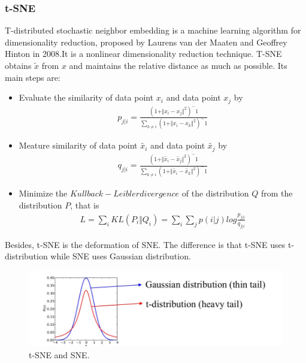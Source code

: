 \documentclass{article}
\begin{document}
\subsubsection{t-SNE}
\indent T-distributed stochastic neighbor embedding is a machine learning algorithm for dimensionality reduction, proposed by Laurens van der Maaten and Geoffrey Hinton in 2008.\cite{maaten2008visualizing}It is a nonlinear dimensionality reduction technique. T-SNE obtains $\tilde{x}$ from $x$ and maintains the relative distance as much as possible. Its main steps are:
\begin{itemize}
	\item  Evaluate the similarity of data point $x_i$ and data point $x_j$ by
	\begin{eqnarray}
	p_{j|i}=\frac{(1+\Vert x_i-x_j \Vert^2)^-1}{\sum_{k\neq i}(1+\Vert x_i-x_k \Vert^2)^-1}
	\end{eqnarray}
	
	\item  Meature similarity of data point $\tilde{x_i}$ and data point $\tilde{x_j}$ by
	\begin{eqnarray}
	q_{j|i}=\frac{(1+\Vert \tilde{x_i}-\tilde{x_j} \Vert^2)^-1}{\sum_{k\neq i}(1+\Vert \tilde{x_i}-\tilde{x_k} \Vert^2)^-1}
	\end{eqnarray}
	
	\item  Minimize the $Kullback-Leibler divergence$ of the distribution $Q$ from the distribution $P$, that is
	\begin{eqnarray}
	L = \sum_{i}KL(P_i\Vert Q_i)=\sum_{i}\sum_{j}p(i|j)log\frac{p_{j|i}}{q_{j|i}}
	\end{eqnarray}
\end{itemize}

\indent Besides, t-SNE is the deformation of SNE. The difference is that t-SNE uses t-distribution while SNE uses Gaussian distribution.
\begin{figure}[htbp]
	\centering
	\includegraphics[scale=0.3]{figures/SNE.jpg}
	\caption{t-SNE and SNE.}
	\label{fig:SNE}
\end{figure}\par
\end{document}
